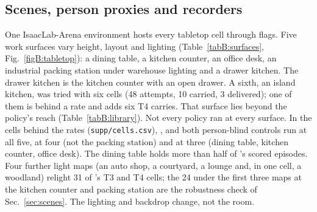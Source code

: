 \subsection{Scenes, person proxies and recorders}
\label{appB:scenes}

One IsaacLab-Arena environment hosts every tabletop cell through flags. Five work surfaces vary height, layout and lighting (Table~\ref{tabB:surfaces}, Fig.~\ref{figB:tabletop}): a dining table, a kitchen counter, an office desk, an industrial packing station under warehouse lighting and a drawer kitchen. The drawer kitchen is the kitchen counter with an open drawer. A sixth, an island kitchen, was tried with six \pifive{} cells (48 attempts, 10 carried, 3 delivered); one of them is behind a rate and adds six T4 carries. That surface lies beyond the policy's reach (Table~\ref{tabB:library}). Not every policy ran at every surface. In the cells behind the rates (\texttt{supp/cells.csv}), \pifive{}, \pizero{} and both person-blind controls run at all five, \pifast{} at four (not the packing station) and \grd{} at three (dining table, kitchen counter, office desk). The dining table holds more than half of \pifive{}'s scored episodes. Four further light maps (an auto shop, a courtyard, a lounge and, in one cell, a woodland) relight 31 of \pifive{}'s T3 and T4 cells; the 24 under the first three maps at the kitchen counter and packing station are the robustness check of Sec.~\ref{sec:scenes}. The lighting and backdrop change, not the room.

